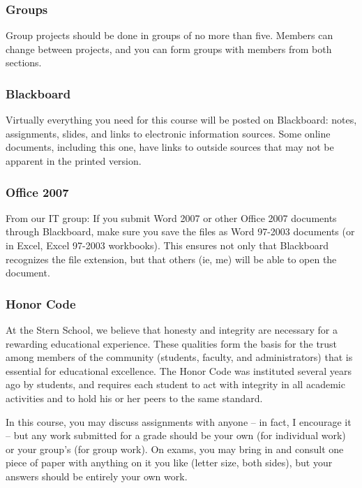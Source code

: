 \documentclass[letterpaper,12pt]{article}
\begin{document}
\subsubsection*{Groups}

Group projects should be done in groups of no more than five.
Members can change between projects, and you can form groups
with members from both sections.  


\subsubsection*{Blackboard}

Virtually everything you need for this course will be posted on Blackboard: 
notes, assignments, slides, and links to electronic information sources.  
Some online documents, including this one, 
have links to outside sources that
may not be apparent in the printed version.


\subsubsection*{Office 2007}
 
From our IT group:  If you submit Word 2007 or other Office 2007 
documents through Blackboard, make sure you save the files as Word 97-2003 documents 
(or in Excel, Excel 97-2003 workbooks). 
This ensures not only that Blackboard recognizes the file extension, 
but that others (ie, me) will be able to open the document.


\subsubsection*{Honor Code}

At the Stern School, 
we believe that honesty and integrity are necessary for a
rewarding educational experience. These qualities form the basis
for the trust among members of the community (students,
faculty, and administrators) that is essential for educational
excellence. The Honor Code was instituted several years ago by
students, and requires each student to act with integrity in all
academic activities and to hold his or her peers to the same
standard.

In this course, you may discuss assignments with anyone  -- in
fact, I encourage it -- but any work submitted for a
grade should be your own (for individual work) or your group's
(for group work). On exams, you may bring in and consult one piece
of paper with anything on it you like (letter size, both sides),
but your answers should be entirely your own work.
\end{document}
